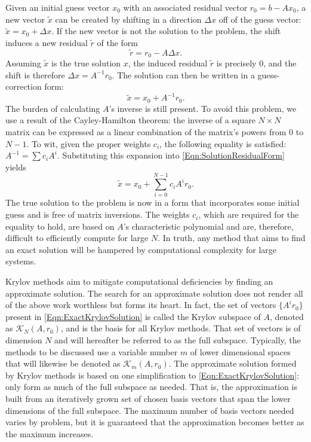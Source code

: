 \documentclass[Prelim,12pt]{WisconsinThesis}
\newcommand{\by}    {\!\times\!}
\newcommand{\dx}    {\ensuremath{\Delta{x}}}
\begin{document}
Given an initial guess vector $x_0$ with an associated residual vector $r_0 = b - A x_0$, a new vector $\tilde{x}$ can be created by shifting in a direction \dx{} off of the guess vector: $\tilde{x} = x_0 + \dx$.
If the new vector is not the solution to the problem, the shift induces a new residual $\tilde{r}$ of the form
\begin{equation}
    \tilde{r} = r_0  - A \dx.
    \label{Eqn:ResidualUpdateForm}
\end{equation}
Assuming $\tilde{x}$ is the true solution $x$, the induced residual $\tilde{r}$ is precisely $0$, and the shift is therefore $\dx = A^{-1}r_0$.
The solution can then be written in a guess-correction form:
\begin{equation}
    \tilde{x} = x_0 + A^{-1}r_0.
    \label{Eqn:SolutionResidualForm}
\end{equation}
The burden of calculating $A$'s inverse is still present.
To avoid this problem, we use a result of the Cayley-Hamilton theorem: the inverse of a square $N \by N$ matrix can be expressed as a linear combination of the matrix's powers from $0$ to $N-1$.
To wit, given the proper weights $c_i$, the following equality is satisfied: $A^{-1} = \sum c_i A^i$.
Substituting this expansion into \cref{Eqn:SolutionResidualForm} yields
\begin{equation}
    \tilde{x} = x_0 + \sum_{i = 0}^{N-1} c_i A^i r_0.
    \label{Eqn:ExactKrylovSolution}
\end{equation}
The true solution to the problem is now in a form that incorporates some initial guess and is free of matrix inversions.
The weights $c_i$, which are required for the equality to hold, are based on $A$'s characteristic polynomial and are, therefore, difficult to efficiently compute for large $N$.
In truth, any method that aims to find an exact solution will be hampered by computational complexity for large systems.



Krylov methods aim to mitigate computational deficiencies by finding an approximate solution.
The search for an approximate solution does not render all of the above work worthless but forms its heart.
In fact, the set of vectors $\{A^i r_0\}$ present in \cref{Eqn:ExactKrylovSolution} is called the Krylov subspace of $A$, denoted as $\mathcal{K}_N(A,r_0)$, and is the basis for all Krylov methods.
That set of vectors is of dimension $N$ and will hereafter be referred to as the full subspace.
Typically, the methods to be discussed use a variable number $m$ of lower dimensional spaces that will likewise be denoted as $\mathcal{K}_m(A,r_0)$.
The approximate solution formed by Krylov methods is based on one simplification to \cref{Eqn:ExactKrylovSolution}: only form as much of the full subspace as needed.
That is, the approximation is built from an iteratively grown set of chosen basis vectors that span the lower dimensions of the full subspace.
The maximum number of basis vectors needed varies by problem, but it is guaranteed that the approximation becomes better as the maximum increases.
\end{document}
